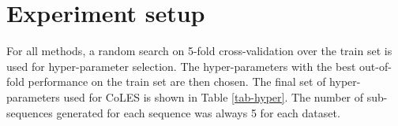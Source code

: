 \documentclass[sigconf, anonymous]{acmart}
\begin{document}
\fi

\section{Experiment setup} \label{app-sec-exp-setup}

For all methods, a random search on 5-fold cross-validation over the train set is used for hyper-parameter selection. The hyper-parameters with the best out-of-fold performance on the train set are then chosen. The final set of hyper-parameters used for CoLES is shown in Table \ref{tab-hyper}. The number of sub-sequences generated for each sequence was always 5 for each dataset.
\end{document}
